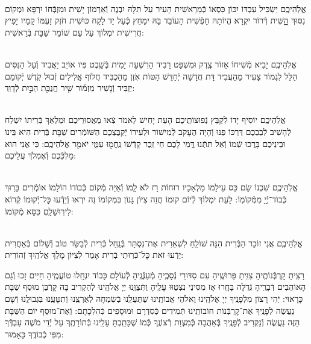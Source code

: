 \documentclass[twoside, openany, parskip=half, 11pt]{book}
\begin{document}
\begin{footnotesize}
\\
אֱלֹֽהֵיכֶֽם יַשְׂכִּיל עַבְדּוֹ יִכּוֹן כִּסְאוֹ כְּֿמֵרֵאשִׁית הָעִיר עַל תִּלָּהּ יִבְנֶה וְֿאַרְמוֹן יָשִׁית וּמִזְבְּֿחוֹ יִרְפָּא וּמְקוֹם נִסּוּךְ הׇׇׇָשִּׁית דְּֿרוֹר יִקְרָא הֱיוֹתָהּ חָפְֿשִׁית הָעוֹבֵד בָּהּ יִמָּחֵץ כְּֿעַל יַד לָקַח כּוּשִׁית חֹזֶק זַעְמּוֹ קָמָיו יָפִיץ חֲרִישִׁית יִמְלוֹךְ עַל עַם שׁוֹמֵר שַׁבָּת בְּֿרֵאשִׁית:

\\
אֱלֹֽהֵיכֶֽם יָבִיא מְֿשִׁיחוֹ אֵזוֹר צֶֽדֶק וּמִשְׁפָּט רָבִיד הָרִשְׁעָה יָמִית בְּֿשֵֽׁבֶט פִּיו אוֹיֵב יַאֲבִיד וְֿעַל הַנִּסִּים הַלֵּל לִגְמוֹר צָעִיר מֵהַעֲבִיד דָּת חֲדָשָׁה יְֿחַדֵּשׁ הַטּוֹת אֹֽזֶן מֵהַכְבִּיד חֲלוֹף אֱלִילִים זְֿבוּל קֹֽדֶשׁ יְֿקוֹמֵם יַזְבִּיד וְֿנָשִׁיר מִזְמ֡וֹר שִׁ֤יר חֲנֻכַּ֖ת הַבַּ֣יִת לְֿדָוִֽד:

\\
אֱלֹֽהֵיכֶֽם יוֹסִיף יָדוֹ לְֿקַבֵּץ נְֿפוּצוֹתֵֽיכֶם הָעֵת יָחִישׁ לֵאמֹר צְֿאוּ מֵאֲסוּרֵיכֶם וּמַלְאַךְ בְּֿרִיתוֹ יִשְׁלַח לְֿהָשִׁיב לְֿבַבְכֶם דַּרְכּוֹ פַּנּוּ וְֿהָיָה הֶעָקֹב לְֿמִישׁוֹר וּלְעִירוֹ יְֿקַבֶּצְכֶם הַשּׁוֹמְֿרִים שַׁבָּת בְּֿרִית הִיא בֵּינוֹ וּבֵינֵיכֶם בָּרֲכוּ שְֿׁמוֹ וְֿאַל תִּתְּֿנוּ דֳּמִי לָכֶם חַי זֵֽכֶר קָדְֿשׁוֹ נַֽחֲמ֖וּ עַמִּ֑י יֹאמַ֖ר אֱלֹהֵיכֶֽם: כִּי אֲנִי הוּא מַלְכְּֿכֶם וְֿאֶמְלֹךְ עֲלֵיכֶם:


\\
אֱלֹֽהֵיכֶֽם שִׁכְנוֹ שָׂם כֵּס עֵילָמוֹ מַלְאָכָיו רוּחוֹת רָז לֹא לָֽמוֹ וְֿאַיֵּה מְֿקוֹם כְּֿבוֹדוֹ הוֹלָמוֹ אוֹמְֿרִים בָּר֥וּךְ כְּֿבוֹד־יְֿיָ֖ מִמְּֿקוֹמֽוֹ: לָעֵת יִמְלוֹךְ לְֿיוֹם קוּמוֹ חֲזֵה צִיּוֹן גָּנוֹן בִּמְקוֹמוֹ זֶה יִרְאוּ וְֿיֵדְֿעוּ כׇּל־יְֿקוּמוֹ קְֿרוֹא לִירֽוּשָׁלַֽםִ כִּסֵּא מְֿקוֹמוֹ:

\\
אֱלֹֽהֵיכֶֽם אֲנִי זוֹכֵר הַבְּֿרִית הִנֵּה שׁוֹלֵֽחַ לִשְׁאֵרִית אֶת־נִסְתָּר בְּֿנַֽחַל כְּֿרִית לְֿבַשֵּׂר טוֹב וְֿשָׁלוֹם בְּֿאַחֲרִית יֵדְֿעוּ זֹאת כׇּל־כְּֿרֽוּתֵי בְֿרִית אָמַר לְֿצִיּוֹן מָלַךְ אֱלֹהַֽיִךְ זְֿהוֹרִית:

\end{footnotesize}



\sepline

\shabboskiddushhashem


רָצִֽיתָ קׇרְבְּֿנוֹתֶֽיהָ צִוִּֽיתָ פֵּרוּשֶֽׁיהָ עִם סִדּוּרֵי נְֿסָכֶֽיהָ מְֿעַנְּֿגֶֽיהָ לְֿעוֹלָם כָּבוֹד יִנְחָֽלוּ טוֹעֲמֶֽיהָ חַיִּים זָכוּ וְֿגַם הָאוֹהֲבִים דְּֿבָרֶֽיהָ גְּֿדֻלָּה בָּחָֽרוּ אָז מִסִּינַי נִצְטַוּוּ עָלֶֽיהָ
וַתְּֿצַוֵּֽנוּ יְיָ אֱלֹהֵֽינוּ לְֿהַקְרִיב בָּהּ קָרְֿבַּן מוּסַף שַׁבָּת כָּרָאוּי: יְֿהִי רָצוֹן מִלְּֿפָנֶֽיךָ יְיָ אֱלֹהֵֽינוּ וֵאלֹהֵי אֲבוֹתֵֽינוּ שֶׁתַּעֲלֵֽנוּ בְֿשִׂמְחָה לְֿאַרְצֵֽנוּ וְֿתִטָּעֵֽנוּ בִּגְבוּלֵֽנוּ וְֿשָׁם נַעֲשֶׂה לְֿפָנֶֽיךָ אֶת־קׇרְבְּֿנוֹת חוֹבוֹתֵֽינוּ תְּֿמִידִים כְּֿסִדְרָם וּמוּסָפִים כְּֿהִלְכָתָם: וְֿאֶת־מוּסַף יוֹם הַשַּׁבָּת הַזֶּה נַעֲשֶׂה וְֿנַקְרִיב לְֿפָנֶֽיךָ בְּֿאַהֲבָה כְּֿמִצְוַת רְֿצוֹנֶֽךָ כְּֿמוֹ שֶׁכָּתַֽבְתָּ עָלֵֽינוּ בְּֿתוֹרָתֶֽךָ עַל יְֿדֵי מֹשֶׁה עַבְדְּֿךָ מִפִּי כְֿבוֹדֶֽךָ כָּאָמוּר:
\end{document}

